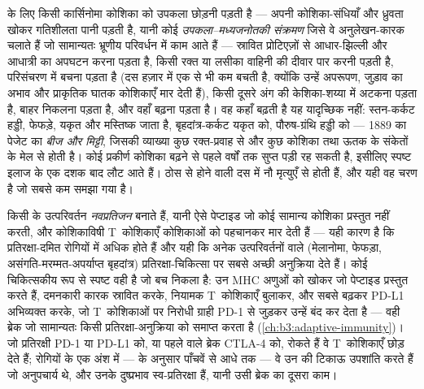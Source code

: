 \begin{definition}[घुसपैठ और विक्षेपण]\label{def:b3:cancer-biology:metastasis}
 के लिए किसी कार्सिनोमा कोशिका को उपकला छोड़नी पड़ती है ---
अपनी कोशिका-संधियाँ और ध्रुवता खोकर गतिशीलता पानी पड़ती है, यानी कोई
\emph{उपकला--मध्यजनोतकी संक्रमण} जिसे वे अनुलेखन-कारक चलाते हैं जो
सामान्यतः भ्रूणीय परिवर्धन में काम आते हैं --- स्रावित प्रोटिएज़ों से
आधार-झिल्ली और आधात्री का अपघटन करना पड़ता है, किसी रक्त या लसीका
वाहिनी की दीवार पार करनी पड़ती है, परिसंचरण में बचना पड़ता है (दस हज़ार
में एक से भी कम बचती है, क्योंकि उन्हें अपरूपण, जुड़ाव का अभाव और
प्राकृतिक घातक कोशिकाएँ मार देती हैं), किसी दूसरे अंग की केशिका-शय्या
में अटकना पड़ता है, बाहर निकलना पड़ता है, और वहाँ बढ़ना पड़ता है। वह
कहाँ बढ़ती है यह यादृच्छिक नहीं: स्तन-कर्कट हड्डी, फेफड़े, यकृत और
मस्तिष्क जाता है, बृहदांत्र-कर्कट यकृत को, पौरुष-ग्रंथि  हड्डी को
--- 1889 का पेजेट का \emph{बीज और मिट्टी}, जिसकी व्याख्या कुछ
रक्त-प्रवाह से और कुछ कोशिका तथा ऊतक के संकेतों के मेल से होती है। कोई
प्रकीर्ण कोशिका बढ़ने से पहले वर्षों तक सुप्त पड़ी रह सकती है,
इसीलिए  स्पष्ट इलाज के एक दशक बाद लौट आते हैं। ठोस  से
होने वाली दस में नौ मृत्युएँ  से होती हैं, और यही वह चरण है जो
सबसे कम समझा गया है।
\end{definition}

\begin{proposition}[प्रतिरक्षा-तंत्र से बचना]\label{prop:b3:cancer-biology:immune}
किसी  के उत्परिवर्तन \emph{नवप्रतिजन} बनाते हैं, यानी ऐसे
पेप्टाइड जो कोई सामान्य कोशिका प्रस्तुत नहीं करती, और कोशिकाविषी
T~कोशिकाएँ  कोशिकाओं को पहचानकर मार देती हैं --- यही कारण है कि
प्रतिरक्षा-दमित रोगियों में अधिक  होते हैं और यही कि अनेक
उत्परिवर्तनों वाले  (मेलानोमा, फेफड़ा, असंगति-मरम्मत-अपर्याप्त
बृहदांत्र) प्रतिरक्षा-चिकित्सा पर सबसे अच्छी अनुक्रिया देते हैं। कोई
चिकित्सकीय रूप से स्पष्ट  वही है जो बच निकला है: उन MHC अणुओं को
खोकर जो पेप्टाइड प्रस्तुत करते हैं, दमनकारी कारक स्रावित करके, नियामक
T~कोशिकाएँ बुलाकर, और सबसे बढ़कर PD-L1 अभिव्यक्त करके, जो T~कोशिकाओं
पर निरोधी ग्राही PD-1 से जुड़कर उन्हें बंद कर देता है --- वही ब्रेक जो
सामान्यतः किसी प्रतिरक्षा-अनुक्रिया को समाप्त करता है
(\cref{ch:b3:adaptive-immunity})। जो प्रतिरक्षी PD-1 या PD-L1 को, या
पहले वाले ब्रेक CTLA-4 को, रोकते हैं वे T~कोशिकाएँ छोड़ देते हैं; रोगियों
के एक अंश में ---  के अनुसार पाँचवें से आधे तक --- वे उन 
की टिकाऊ उपशांति करते हैं जो अनुपचार्य थे, और उनके दुष्प्रभाव
स्व-प्रतिरक्षा हैं, यानी उसी ब्रेक का दूसरा काम।
\end{proposition}

